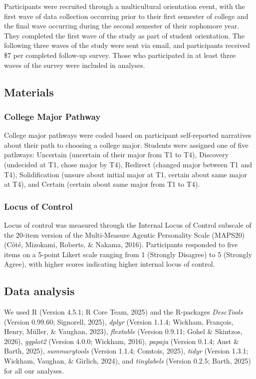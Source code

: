 \documentclass[
  english,
  man,floatsintext]{apa6}
\begin{document}
Participants were recruited through a multicultural orientation event, with the first wave of data collection occurring prior to their first semester of college and the final wave occurring during the second semester of their sophomore year. They completed the first wave of the study as part of student orientation. The following three waves of the study were sent via email, and participants received \$7 per completed follow-up survey. Those who participated in at least three waves of the survey were included in analyses.

\subsection{Materials}\label{materials}

\subsubsection{College Major Pathway}\label{college-major-pathway}

College major pathways were coded based on participant self-reported narratives about their path to choosing a college major. Students were assigned one of five pathways: Uncertain (uncertain of their major from T1 to T4), Discovery (undecided at T1, chose major by T4), Redirect (changed major between T1 and T4), Solidification (unsure about initial major at T1, certain about same major at T4), and Certain (certain about same major from T1 to T4).

\subsubsection{Locus of Control}\label{locus-of-control}

Locus of control was measured through the Internal Locus of Control subscale of the 20-item version of the Multi-Measure Agentic Personality Scale (MAPS20) (Côté, Mizokami, Roberts, \& Nakama, 2016). Participants responded to five items on a 5-point Likert scale ranging from 1 (Strongly Disagree) to 5 (Strongly Agree), with higher scores indicating higher internal locus of control.

\subsection{Data analysis}\label{data-analysis}

We used R (Version 4.5.1; R Core Team, 2025) and the R-packages \emph{DescTools} (Version 0.99.60; Signorell, 2025), \emph{dplyr} (Version 1.1.4; Wickham, François, Henry, Müller, \& Vaughan, 2023), \emph{flextable} (Version 0.9.11; Gohel \& Skintzos, 2026), \emph{ggplot2} (Version 4.0.0; Wickham, 2016), \emph{papaja} (Version 0.1.4; Aust \& Barth, 2025), \emph{summarytools} (Version 1.1.4; Comtois, 2025), \emph{tidyr} (Version 1.3.1; Wickham, Vaughan, \& Girlich, 2024), and \emph{tinylabels} (Version 0.2.5; Barth, 2025) for all our analyses.
\end{document}
